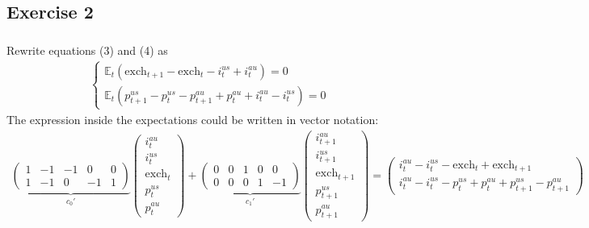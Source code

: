 \documentclass[]{article}
\begin{document}
\subsection*{Exercise 2}

\subsubsection{}
Rewrite equations (3) and (4) as
\begin{equation}
	\begin{split}
		\begin{cases}
			\mathbb{E}_t\left(\text{exch}_{t+1} - \text{exch}_{t} - i_t^{us} + i_t^{au}\right) = 0 \\ \nonumber
			\mathbb{E}_t\left(p_{t + 1}^{us} - p_t^{us} - p_{t + 1}^{au} + p_t^{au} + i_t^{au} - i_t^{us}\right) = 0
		\end{cases}
	\end{split}
\end{equation}
The expression inside the expectations could be written in vector notation:
\begin{equation}
	\begin{split}
		\underbrace{\begin{pmatrix}
			1 & -1 & -1 & 0 & 0 \\
			1 & -1 & 0 & -1 & 1
		\end{pmatrix}}_{c_0'}\begin{pmatrix}
			i_t^{au} \\ i_t^{us} \\ \text{exch}_t \\ p_t^{us} \\ p_t^{au}
		\end{pmatrix} + \underbrace{\begin{pmatrix}
			0 & 0 & 1 & 0 & 0 \\
			0 & 0 & 0 & 1 & -1
		\end{pmatrix}}_{c_1'}\begin{pmatrix}
			i_{t + 1}^{au} \\ i_{t + 1}^{us} \\ \text{exch}_{t + 1} \\ p_{t + 1}^{us} \\ p_{t + 1}^{au}
		\end{pmatrix} = \begin{pmatrix}
			i_t^{au} - i_t^{us} - \text{exch}_t + \text{exch}_{t + 1} \\
			i_t^{au} - i_t^{us} - p_t^{us} + p_t^{au} + p_{t + 1}^{us} - p_{t + 1}^{au}
		\end{pmatrix} \nonumber
	\end{split}
\end{equation}
\end{document}
